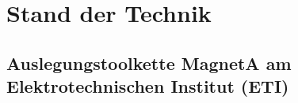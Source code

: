 \chapter{Stand der Technik}
\section{Auslegungstoolkette MagnetA am Elektrotechnischen Institut (ETI)}
